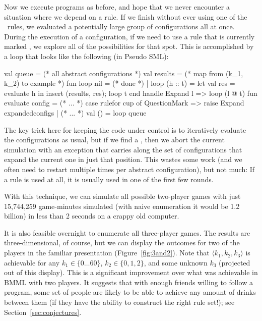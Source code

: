 \documentclass[twocolumn]{article}
\begin{document}
Now we execute programs as before, and hope that we never encounter a
situation where we depend on a rule. If we finish without ever using
one of the \any\ rules, we evaluated a potentially large group of
configurations all at once. During the execution of a configuration,
if we need to use a rule that is currently marked \any, we explore all
of the possibilities for that spot. This is accomplished by a loop
that looks like the following (in Pseudo SML):

\begin{code}
val queue = (* all abstract configurations *)
val results = (* map from (k_1, k_2) 
                 to example *)
\codeskip
fun loop nil = (* done *)
  | loop (h :: t) =
      let
        val res = evaluate h
      in
        insert (results, res);
        loop t
      end handle Expand l => loop (l @ t)
\codeskip
fun evaluate config =
   (* ... *) 
   case rulefor cup of 
      QuestionMark =>
         raise Expand expandedconfigs
    | (* ... *)
\codeskip
val () = loop queue
\end{code}

The key trick here for keeping the code under control is to
iteratively evaluate the configurations as usual, but if we find a
\any, then we abort the current simulation with an exception that
carries along the set of configurations that expand the current one in
just that position. This wastes some work (and we often need to
restart multiple times per abstract configuration), but not much: If a
rule is used at all, it is usually used in one of the first few
rounds.

With this technique, we can simulate all possible two-player games
with just 15,744,259 game-minutes simulated (with naive enumeration it
would be 1.2 billion) in less than 2 seconds on a crappy old computer.

It is also feasible overnight to enumerate all three-player games. The
results are three-dimensional, of course, but we can display the
outcomes for two of the players in the familiar presentation
(Figure~\ref{fig:3and2}). Note that $\langle k_1, k_2, k_3 \rangle$ is
achievable for any $k_1 \in \{ 0 \ldots 60 \}$, $k_2 \in \{ 0, 1, 2 \}$,
and some unknown $k_3$ (projected out of this display). This is a
significant improvement over what was achievable in BMML with two
players. It suggests that with enough friends willing to follow a
program, some set of people are likely to be able to achieve any
amount of drinks between them (if they have the ability to construct
the right rule set!); see Section~\ref{sec:conjectures}.
\end{document}
